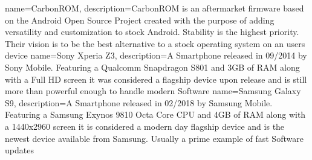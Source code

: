 { name=CarbonROM,
	description={CarbonROM is an aftermarket firmware based on the Android Open Source Project created with the purpose of adding versatility and customization to stock Android. Stability is the highest priority. Their vision is to be the best alternative to a stock operating system on an users device}}
{ name=Sony Xperia Z3,
	description={A Smartphone released in 09/2014 by Sony Mobile.
	Featuring a Qualcomm Snapdragon S801 and 3GB of RAM along with a Full HD screen it was considered a flagship device upon release and is still more than powerful enough to handle modern Software}}
{ name=Samsung Galaxy S9,
	description={A Smartphone released in 02/2018 by Samsung Mobile.
	Featuring a Samsung Exynos 9810 Octa Core CPU and 4GB of RAM along with a 1440x2960 screen it is considered a modern day flagship device and is the newest device available from Samsung. Usually a prime example of fast Software updates}}